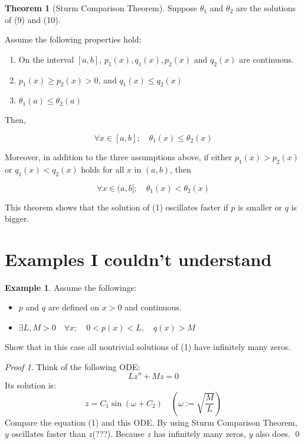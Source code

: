 \documentclass[11pt,a4paper]{amsart}
\theoremstyle{definition}
\newtheorem{thm}{Theorem}
\newtheorem{ex}{Example}
\theoremstyle{definition}
\theoremstyle{remark}
\newtheorem{prf}{Proof}
\begin{document}
\begin{thm}[Sturm Comparison Theorem]

Suppose $\theta_1$ and $\theta_2$ are the solutions of (9) and (10).

Assume the following properties hold:

\begin{enumerate}
\item On the interval $[a,b]$, $p_1(x),q_1(x),p_2(x)$ and $q_2(x)$ are continuous.
\item $p_1(x) \geq p_2(x) > 0$, and $q_1(x) \leq q_2(x)$
\item $\theta_1(a) \leq \theta_2(a)$
\end{enumerate}

Then,

$$\forall x \in [a,b]; \quad \theta_1(x) \leq \theta_2(x)$$

Moreover, in addition to the three assumptions above, if either $p_1(x) > p_2(x)$ or $q_1(x) < q_2(x)$ holds for all $x$ in $(a,b)$, then

$$\forall x \in (a,b]; \quad \theta_1(x) < \theta_2(x)$$

\end{thm}

This theorem shows that the solution of (1) oscillates faster if $p$ is smaller or $q$ is bigger.

\section{Examples I couldn't understand}
\begin{ex}
Assume the followings:

\begin{itemize}
	\item $p$ and $q$ are defined on $x>0$ and continuous.
	\item $\exists L,M > 0 \quad \forall x; \quad 0<p(x)<L, \quad q(x)>M $
\end{itemize}

Show that in this case all nontrivial solutions of (1) have infinitely many zeros.

\begin{prf}
Think of the following ODE:
$$Lz'' + Mz = 0$$
Its solution is:
$$z = C_1 \sin (\omega + C_2) \quad (\omega := \sqrt{\frac{M}{L}})$$
Compare the equation (1) and this ODE. By using Sturm Comparison Theorem, $y$ oscillates faster than $z$(???). Because $z$ has infinitely many zeros, $y$ also does.
\qed
\end{prf}
\end{ex}
\end{document}
